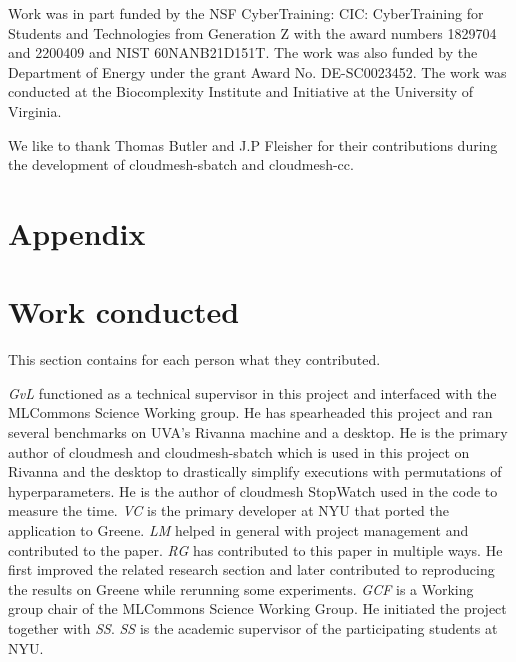 \documentclass[sigplan,screen]{acmart}
\begin{document}
\begin{acks}

Work was in part funded by the NSF CyberTraining: CIC: CyberTraining for Students and Technologies from Generation Z with the award numbers 1829704 and 2200409 and NIST 60NANB21D151T.  The work was also funded by the Department of Energy under the grant Award No. DE-SC0023452. The work was conducted at the Biocomplexity Institute and Initiative at the University of Virginia.

We like to thank Thomas Butler and J.P Fleisher for their contributions during the development of cloudmesh-sbatch and cloudmesh-cc.

\end{acks}




\appendix


\section{Appendix}

\section{Work conducted}

This section contains for each person what they contributed.

{\em GvL} functioned as a technical supervisor in this project and interfaced with the MLCommons Science Working group. He has spearheaded this project and ran several benchmarks on UVA's Rivanna machine and a desktop. He is the primary author of cloudmesh and cloudmesh-sbatch which is used in this project on Rivanna and the desktop to drastically simplify executions with permutations of hyperparameters. He is the author of cloudmesh StopWatch used in the code to measure the time.
{\em VC} is the primary developer at NYU that ported the application to Greene.  
{\em LM} helped in general with project management and contributed to the paper.
{\em RG} has contributed to this paper in multiple ways. He first improved the related research section and later contributed to reproducing the results on Greene while rerunning some experiments.
{\em GCF} is a Working group chair of the MLCommons Science Working Group. He initiated the project together with {\em SS}. {\em SS} is the academic supervisor of the participating students at NYU.
\end{document}
